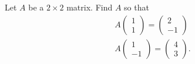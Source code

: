 \documentclass{ximera}
\begin{document}
\begin{exercise} \label{c4.1.8}
Let $A$ be a $2\times 2$ matrix.  Find $A$ so that
\begin{eqnarray*}
A\left(\begin{array}{r} 1 \\ 1 \end{array}\right) =
\left(\begin{array}{r} 2 \\ -1 \end{array}\right) \\
A\left(\begin{array}{r} 1 \\ -1 \end{array}\right) =
\left(\begin{array}{r} 4 \\ 3 \end{array}\right).
\end{eqnarray*}

\begin{solution}


\end{solution}
\end{exercise}
\end{document}
